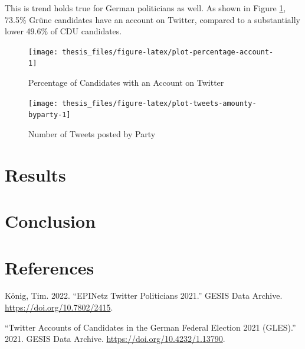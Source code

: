 \documentclass[a4paper,11pt]{article}
\newlength{\cslhangindent}
\newenvironment{CSLReferences}[2] %
 {\setlength{\cslhangindent}{#2\parindent}%
  \setlength{\parindent}{0pt}%
  \everypar{\setlength{\hangindent}{\cslhangindent}}\ignorespaces}
 {\par}
\begin{document}
This is trend holds true for German politicians as well. As shown in Figure \texttt{\ref{fig:plot-percentage-account}}, 73.5\% Grüne candidates have an account on Twitter, compared to a substantially lower 49.6\% of CDU candidates.
\begin{figure}[H]

{\centering \texttt{[image: thesis\_files/figure-latex/plot-percentage-account-1]} 

}

\caption{Percentage of Candidates with an Account on Twitter}\label{fig:plot-percentage-account}
\end{figure}
\begin{figure}[H]

{\centering \texttt{[image: thesis\_files/figure-latex/plot-tweets-amounty-byparty-1]} 

}

\caption{Number of Tweets posted by Party}\label{fig:plot-tweets-amounty-byparty}
\end{figure}
\newpage

\hypertarget{results}{%
\section{Results}\label{results}}

\newpage

\hypertarget{conclusion}{%
\section{Conclusion}\label{conclusion}}

\newpage

\hypertarget{references}{%
\section*{References}\label{references}}

\noindent

\setlength{\parindent}{-0.5cm}
\setlength{\leftskip}{0.5cm}
\setlength{\parskip}{8pt}

\hypertarget{refs}{}
\begin{CSLReferences}{1}{0}
\leavevmode{}%
König, Tim. 2022. {``{EPINetz Twitter Politicians} 2021.''} {GESIS Data Archive}. \url{https://doi.org/10.7802/2415}.

\leavevmode{}%
{``Twitter Accounts of Candidates in the {German} Federal Election 2021 ({GLES}).''} 2021. {GESIS Data Archive}. \url{https://doi.org/10.4232/1.13790}.

\end{CSLReferences}
\indent
\setlength{\parindent}{17pt}
\setlength{\leftskip}{0pt}
\setlength{\parskip}{0pt}
\end{document}
